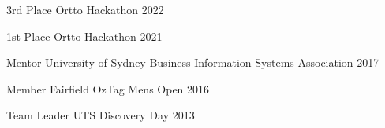



\begin{cvhonors}

  \cvhonor
  {3rd Place} %
  {Ortto Hackathon} %
  {} %
  {2022} %

  \cvhonor
  {1st Place} %
  {Ortto Hackathon} %
  {} %
  {2021} %

  \cvhonor
  {Mentor} %
  {University of Sydney Business Information Systems Association} %
  {} %
  {2017} %

  \cvhonor
  {Member} %
  {Fairfield OzTag Mens Open} %
  {} %
  {2016} %

  \cvhonor
  {Team Leader} %
  {UTS Discovery Day} %
  {} %
  {2013} %

\end{cvhonors}
